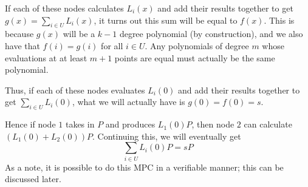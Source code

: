 \documentclass{article}
\begin{document}
If each of these nodes calculates $L_i(x)$ and add their results together to get $g(x)=\sum_{i\in U}L_i(x)$, it turns out this sum will be equal to $f(x)$. This is because $g(x)$ will be a $k-1$ degree polynomial (by construction), and we also have that $f(i)=g(i)$ for all $i\in U$. Any polynomials of degree $m$ whose evaluations at at least $m+1$ points are equal must actually be the same polynomial.

Thus, if each of these nodes evaluates $L_i(0)$ and add their results together to get $\sum_{i\in U}L_i(0)$, what we will actually have is $g(0)=f(0)=s$.

Hence if node $1$ takes in $P$ and produces $L_1(0)P$, then node $2$ can calculate $(L_1(0)+L_2(0))P$. Continuing this, we will eventually get
$$\sum_{i\in U}L_i(0)P = sP$$ As a note, it is possible to do this MPC in a verifiable manner; this can be discussed later.
\end{document}
